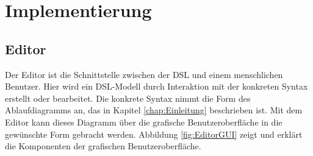 \chapter{Implementierung}
\label{chap:Implementierung}

\section{Editor}
\label{sec:Editor}
Der Editor ist die Schnittstelle zwischen der DSL und einem menschlichen Benutzer. Hier wird ein DSL-Modell durch Interaktion mit der konkreten Syntax erstellt oder bearbeitet. Die konkrete Syntax nimmt die Form des Ablaufdiagramms an, das in Kapitel \ref{chap:Einleitung} beschrieben ist. Mit dem Editor kann dieses Diagramm über die grafische Benutzeroberfläche in die gewünschte Form gebracht werden. Abbildung \ref{fig:EditorGUI} zeigt und erklärt die Komponenten der grafischen Benutzeroberfläche.

